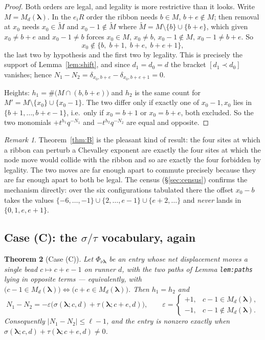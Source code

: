 \documentclass[11pt]{article}
\newtheorem{theorem}{Theorem}[section]
\theoremstyle{definition}
\theoremstyle{remark}
\newtheorem{remark}[theorem]{Remark}
\newcommand{\bl}{\boldsymbol{\lambda}}
\begin{document}
\begin{proof}
Both orders are legal, and legality is more restrictive than it looks. Write
$M=M_d(\bl)$. In the $e_iR$ order the ribbon needs $b\in M$, $b+e\notin M$; then removal
at $x_0$ needs $x_0\in\tilde M$ and $x_0-1\notin\tilde M$ where
$\tilde M=M\setminus\{b\}\cup\{b+e\}$, which given $x_0\ne b+e$ and $x_0-1\ne b$ forces
$x_0\in M$, $x_0\ne b$, $x_0-1\notin M$, $x_0-1\ne b+e$. So
\[
x_0\notin\{b,\;b+1,\;b+e,\;b+e+1\},
\]
the last two by hypothesis and the first two by legality. This is precisely the support
of Lemma~\ref{lem:shift}, and since $d_1=d_0=d$ the bracket $[d_1\prec d_0]$ vanishes;
hence $N_1-N_2=\delta_{x_0,b+e}-\delta_{x_0,b+e+1}=0$.

Heights: $h_1=\#\big(M\cap(b,b+e)\big)$ and $h_2$ is the same count for
$M'=M\setminus\{x_0\}\cup\{x_0-1\}$. The two differ only if exactly one of $x_0-1,x_0$
lies in $\{b+1,\dots,b+e-1\}$, i.e.\ only if $x_0=b+1$ or $x_0=b+e$, both excluded. So
the two monomials $+t^{h_1}q^{-N_1}$ and $-t^{h_2}q^{-N_2}$ are equal and opposite.
\end{proof}

\begin{remark}
Theorem~\ref{thm:B} is the pleasant kind of result: the four sites at which a ribbon can
perturb a Chevalley exponent are exactly the four sites at which the node move would
collide with the ribbon and so are exactly the four forbidden by legality. The two moves
are far enough apart to commute precisely because they are far enough apart to both be
legal. The census (\S\ref{sec:census}) confirms the mechanism directly: over the six
configurations tabulated there the offset $x_0-b$ takes the values
$\{-6,\dots,-1\}\cup\{2,\dots,e-1\}\cup\{e+2,\dots\}$ and \emph{never} lands in
$\{0,1,e,e+1\}$.
\end{remark}

\subsection{Case (C): the $\sigma/\tau$ vocabulary, again}

\begin{theorem}[Case (C)]\label{thm:C}
Let $\Phi_{\nu\bl}$ be an entry whose net displacement moves a single bead
$c\mapsto c+e-1$ on runner $d$, with the two paths of Lemma \texttt{lem:paths} lying in
opposite terms --- equivalently, with
$\big(c-1\in M_d(\bl)\big)\Leftrightarrow\big(c+e\in M_d(\bl)\big)$. Then $h_1=h_2$ and
\[
N_1-N_2=-\varepsilon\big(\sigma(\bl;c,d)+\tau(\bl;c+e,d)\big),\qquad
\varepsilon=\begin{cases}+1,& c-1\in M_d(\bl),\\ -1,& c-1\notin M_d(\bl).\end{cases}
\]
Consequently $|N_1-N_2|\le\ell-1$, and the entry is nonzero exactly when
$\sigma(\bl;c,d)+\tau(\bl;c+e,d)\ne0$.
\end{theorem}
\end{document}
